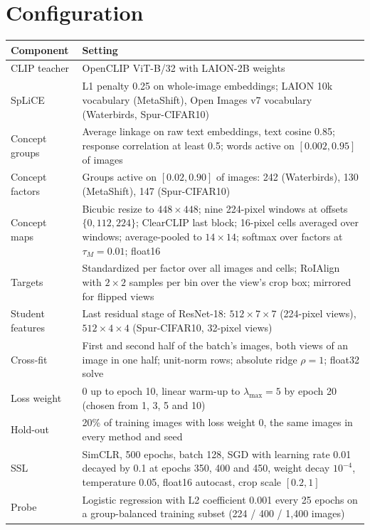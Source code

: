 \documentclass{article}
\begin{document}
\section{Configuration}
\label{app:config}
\begin{table}[ht]
\centering\small
\begin{tabularx}{\linewidth}{lX}
\toprule
Component & Setting \\
\midrule
CLIP teacher & OpenCLIP ViT-B/32 with LAION-2B weights \\
SpLiCE & L1 penalty 0.25 on whole-image embeddings; LAION 10k vocabulary (MetaShift), Open Images v7 vocabulary (Waterbirds, Spur-CIFAR10) \\
Concept groups & Average linkage on raw text embeddings, text cosine 0.85; response correlation at least 0.5; words active on $[0.002,0.95]$ of images \\
Concept factors & Groups active on $[0.02,0.90]$ of images: 242 (Waterbirds), 130 (MetaShift), 147 (Spur-CIFAR10) \\
Concept maps & Bicubic resize to $448\times448$; nine 224-pixel windows at offsets $\{0,112,224\}$; ClearCLIP last block; 16-pixel cells averaged over windows; average-pooled to $14\times14$; softmax over factors at $\tau_M=0.01$; float16 \\
Targets & Standardized per factor over all images and cells; RoIAlign with $2\times2$ samples per bin over the view's crop box; mirrored for flipped views \\
Student features & Last residual stage of ResNet-18: $512\times7\times7$ (224-pixel views), $512\times4\times4$ (Spur-CIFAR10, 32-pixel views) \\
Cross-fit & First and second half of the batch's images, both views of an image in one half; unit-norm rows; absolute ridge $\rho=1$; float32 solve \\
Loss weight & 0 up to epoch 10, linear warm-up to $\lambda_{\max}=5$ by epoch 20 (chosen from 1, 3, 5 and 10) \\
Hold-out & 20\% of training images with loss weight 0, the same images in every method and seed \\
SSL & SimCLR, 500 epochs, batch 128, SGD with learning rate 0.01 decayed by 0.1 at epochs 350, 400 and 450, weight decay $10^{-4}$, temperature 0.05, float16 autocast, crop scale $[0.2,1]$ \\
Probe & Logistic regression with L2 coefficient 0.001 every 25 epochs on a group-balanced training subset (224 / 400 / 1,400 images) \\
\bottomrule
\end{tabularx}
\end{table}
\end{document}
